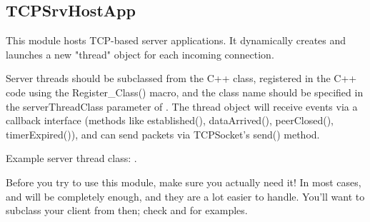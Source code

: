 \subsection{TCPSrvHostApp}

This module hosts TCP-based server applications. It dynamically creates
and launches a new "thread" object for each incoming connection.

Server threads should be subclassed from the 
C++ class, registered in the C++ code using the Register\_Class() macro,
and the class name should be specified in the serverThreadClass
parameter of . The thread object will receive events
via a callback interface (methods like established(), dataArrived(),
peerClosed(), timerExpired()), and can send packets via TCPSocket's send()
method.

Example server thread class: .

\begin{important}
Before you try to use this module, make sure you actually need it!
In most cases,  and  will be completely
enough, and they are a lot easier to handle. You'll want to subclass your
client from  then; check  and
 for examples.
\end{important}


